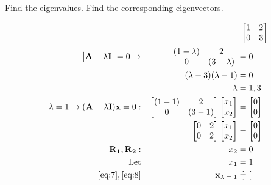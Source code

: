 \documentclass{article}
\begin{document}
Find the eigenvalues.  Find the corresponding eigenvectors.

\begin{align}
    \label{eq:1}
    && &\text{ } \begin{bmatrix}
    1&2\\0&3
    \end{bmatrix}
    \\
    \label{eq:2}
    \begin{vmatrix} \textbf{A} - \lambda\textbf{I}\end{vmatrix}=0 \rightarrow && \begin{vmatrix}
    (1-\lambda) & 2\\
    0 & (3-\lambda)
    \end{vmatrix} &= 0
    \\
    \label{eq:3}
    && (\lambda-3)(\lambda- 1) &= 0
    \\
    \label{eq:4}
    && \lambda &= 1, 3
    \\
    \label{eq:5}
    \lambda = 1 \rightarrow (\textbf{A} - \lambda\textbf{I})\textbf{x}=0: && \begin{bmatrix}
    (1-1) & 2\\
    0 & (3-1)
    \end{bmatrix} \begin{bmatrix}
    x_1\\x_2
    \end{bmatrix} &= \begin{bmatrix}
    0\\0
    \end{bmatrix}
    \\
    \label{eq:6} &&
    \begin{bmatrix}
    0 & 2\\
    0 & 2
    \end{bmatrix} \begin{bmatrix}
    x_1\\x_2
    \end{bmatrix} &= \begin{bmatrix}
    0\\0
    \end{bmatrix}
    \\
    \label{eq:7}
    \textbf{R\textsubscript{1}}, \textbf{R\textsubscript{2}}: && x_2 &= 0
    \\
    \label{eq:8}
    \text{Let} && x_1 &= 1
    \\
    \label{eq:9}
    \eqref{eq:7}, \eqref{eq:8} && \textbf{x\textsubscript{$\lambda=1$}} &= \begin{bmatrix}

\end{bmatrix}
\end{align}
\end{document}
